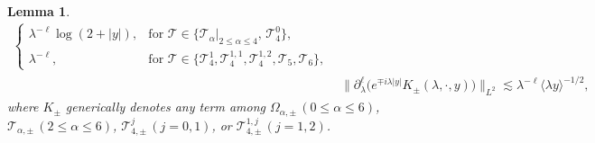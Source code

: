 \documentclass[10pt,a4paper]{amsart}
\newtheorem{lemma}{Lemma}
\begin{document}
\begin{lemma}
\begin{align}
\begin{cases}
		\lambda^{-\ell}\log(2+|y|), & \text{for } \mathcal{T} \in \{\mathcal{T}_\alpha|_{2\le\alpha\le4}, \, \mathcal{T}_4^0\}, \\[2pt]
		\lambda^{-\ell}, & \text{for } \mathcal{T} \in \{\mathcal{T}_4^{1}, \mathcal{T}_4^{1,1}, \mathcal{T}_4^{1,2}, \mathcal{T}_5, \mathcal{T}_6\},
		\end{cases} \label{lemma_projection_T} \\   &\|\partial_\lambda^\ell\big(e^{\mp i\lambda|y|}K_{\pm}(\lambda,\cdot,y)\big)\|_{L^2} \lesssim\lambda^{-\ell}\langle\lambda y\rangle^{-1/2}, \label{lemma_projection_1}
	\end{align}
	where $K_{\pm}$ generically denotes any  term among $\Omega_{\alpha,\pm} \, (0\le\alpha\le6)$, $\mathcal{T}_{\alpha,\pm} \, (2\le\alpha\le6)$, $\mathcal{T}_{4,\pm}^j \, (j=0,1)$, or $\mathcal{T}_{4,\pm}^{1,j} \, (j=1,2)$.
\end{lemma}
\end{document}
